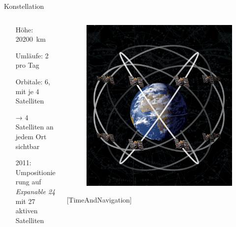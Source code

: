 \begin{frame}{Konstellation}
    \begin{columns}
        \begin{column}{0.5\textwidth}
            \begin{itemize}
                \item[Höhe:] \SI{20200}{\kilo\meter}
                \item[Umläufe:] 2 pro Tag
                \item[Orbitale:] 6, mit je 4 Satelliten
                \item[→] 4 Satelliten an jedem Ort sichtbar
                \item[2011:] Umpositionierung auf \textit{Expanable 24}\\mit 27 aktiven Satelliten
            \end{itemize}
        \end{column}
        \begin{column}{0.3\textwidth}
            \begin{figure}
                \includegraphics[width=\textwidth]{images/satelliten_schaubild.jpg}
            \end{figure}
            {\small [TimeAndNavigation]}
        \end{column}
    \end{columns}
\end{frame}


